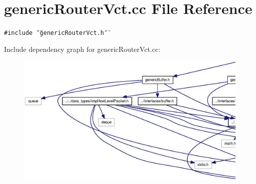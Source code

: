 \section{genericRouterVct.cc File Reference}
\label{genericRouterVct_8cc}
{\tt \#include \char`\"{}genericRouterVct.h\char`\"{}}\par


Include dependency graph for genericRouterVct.cc:\nopagebreak
\begin{figure}[H]
\begin{center}
\leavevmode
\includegraphics[width=420pt]{genericRouterVct_8cc__incl}
\end{center}
\end{figure}
